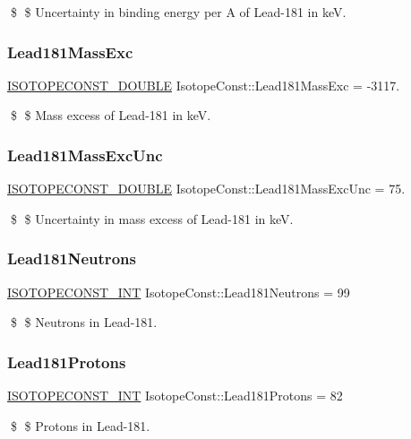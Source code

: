 \$ \$ Uncertainty in binding energy per A of Lead-\/181 in keV. \mbox{\label{group___isotope_const-_lead-_pb181_ga90abe66ebbafeaa41bb48451f1cbe53d}} 
\subsubsection{\texorpdfstring{Lead181\+Mass\+Exc}{Lead181MassExc}}
{\footnotesize\ttfamily \mbox{\hyperlink{group___isotope_const-_macros_ga8f45a7272ce02c0b4c65c44636ed719a}{I\+S\+O\+T\+O\+P\+E\+C\+O\+N\+S\+T\+\_\+\+D\+O\+U\+B\+LE}} Isotope\+Const\+::\+Lead181\+Mass\+Exc = -\/3117.}

\$ \$ Mass excess of Lead-\/181 in keV. \mbox{\label{group___isotope_const-_lead-_pb181_ga514d5802c3ce8b99c47f821f945ad3e3}} 
\subsubsection{\texorpdfstring{Lead181\+Mass\+Exc\+Unc}{Lead181MassExcUnc}}
{\footnotesize\ttfamily \mbox{\hyperlink{group___isotope_const-_macros_ga8f45a7272ce02c0b4c65c44636ed719a}{I\+S\+O\+T\+O\+P\+E\+C\+O\+N\+S\+T\+\_\+\+D\+O\+U\+B\+LE}} Isotope\+Const\+::\+Lead181\+Mass\+Exc\+Unc = 75.}

\$ \$ Uncertainty in mass excess of Lead-\/181 in keV. \mbox{\label{group___isotope_const-_lead-_pb181_ga8049d37d374a1c780563d48e5c3369cc}} 
\subsubsection{\texorpdfstring{Lead181\+Neutrons}{Lead181Neutrons}}
{\footnotesize\ttfamily \mbox{\hyperlink{group___isotope_const-_macros_ga5f18360b3e99483a35c32d789e62621c}{I\+S\+O\+T\+O\+P\+E\+C\+O\+N\+S\+T\+\_\+\+I\+NT}} Isotope\+Const\+::\+Lead181\+Neutrons = 99}

\$ \$ Neutrons in Lead-\/181. \mbox{\label{group___isotope_const-_lead-_pb181_ga0139342c5cb9e273b609b3f8aa5030d4}} 
\subsubsection{\texorpdfstring{Lead181\+Protons}{Lead181Protons}}
{\footnotesize\ttfamily \mbox{\hyperlink{group___isotope_const-_macros_ga5f18360b3e99483a35c32d789e62621c}{I\+S\+O\+T\+O\+P\+E\+C\+O\+N\+S\+T\+\_\+\+I\+NT}} Isotope\+Const\+::\+Lead181\+Protons = 82}

\$ \$ Protons in Lead-\/181. 